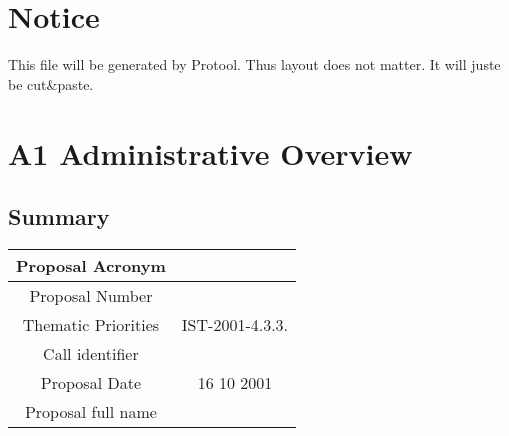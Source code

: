 \documentclass[a4paper,11pt]{report}
\begin{document}
\section*{Notice}
This file will be generated by Protool. Thus layout does not matter. It will
juste be cut\&paste.
\section*{A1 Administrative Overview}
\subsection*{Summary}
\begin{tabular}{|c|c|}
\hline
Proposal Acronym &  \\ \hline
Proposal Number &  \\ \hline
Thematic Priorities & IST-2001-4.3.3. \\ \hline
Call identifier & \\ \hline
Proposal Date & 16 10 2001 \\ \hline
Proposal full name & \\ \hline
\end{tabular}
\end{document}
